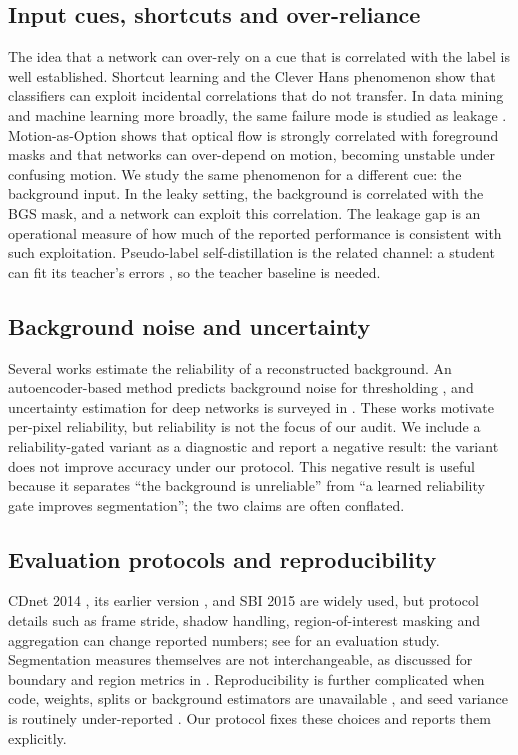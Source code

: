 \documentclass[sn-mathphys-num,iicol]{sn-jnl}
\begin{document}
\subsection{Input cues, shortcuts and over-reliance}
The idea that a network can over-rely on a cue that is correlated with the label
is well established. Shortcut learning \cite{shortcut2020} and the Clever Hans
phenomenon \cite{cleverhans2019} show that classifiers can exploit incidental
correlations that do not transfer. In data mining and machine learning more
broadly, the same failure mode is studied as leakage
\cite{leakage2012,leakage2023}. Motion-as-Option
\cite{motionasoption2025} shows that optical flow is strongly correlated with
foreground masks and that networks can over-depend on motion, becoming unstable
under confusing motion. We study the same phenomenon for a different cue: the
background input. In the leaky setting, the background is correlated with the BGS
mask, and a network can exploit this correlation. The leakage gap is an
operational measure of how much of the reported performance is consistent with
such exploitation. Pseudo-label self-distillation is the related channel: a student can fit its
teacher's errors \cite{noisystudent2020,confirmationbias2020}, so the teacher
baseline is needed.

\subsection{Background noise and uncertainty}
Several works estimate the reliability of a reconstructed background. An
autoencoder-based method predicts background noise for thresholding
\cite{autonoise2023}, and uncertainty estimation for deep networks is surveyed in
\cite{uncertainty2023}. These works motivate per-pixel reliability, but
reliability is not the focus of our audit. We include a reliability-gated variant
as a diagnostic and report a negative result: the variant does not improve
accuracy under our protocol. This negative result is useful because it separates
``the background is unreliable'' from ``a learned reliability gate improves
segmentation''; the two claims are often conflated.

\subsection{Evaluation protocols and reproducibility}
CDnet 2014 \cite{cdnet2014}, its earlier version \cite{cdnet2012}, and SBI 2015
\cite{sbi2015,sbitax2017} are widely used, but protocol details such as frame
stride, shadow handling, region-of-interest masking and aggregation can change
reported numbers; see \cite{sobral2014} for an evaluation study. Segmentation
measures themselves are not interchangeable, as discussed for boundary and
region metrics in \cite{evalmeasure2013}. Reproducibility is further complicated when code, weights, splits or background
estimators are unavailable \cite{leakage2023}, and seed variance is routinely
under-reported \cite{drlmatters2018,scoredist2017,showyourwork2019}. Our
protocol fixes these choices and reports them explicitly.
\end{document}
